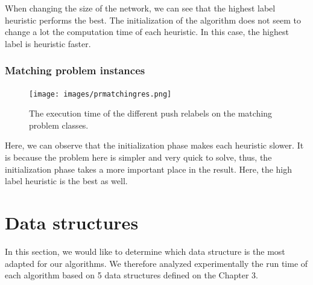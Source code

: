 When changing the size of the network, we can see that the highest label heuristic performs the best. The initialization of the algorithm does not seem to change a lot the computation time of each heuristic. In this case, the highest label is heuristic faster.


\subsubsection{Matching problem instances}
\begin{figure}[H]
\begin{center}
\texttt{[image: images/prmatchingres.png]}
\caption{The execution time of the different push relabels on the matching problem classes.}
\label{fig:mean_matching_pr}
\end{center}
\end{figure}

Here, we can observe that the initialization phase makes each heuristic slower. It is because the problem here is simpler and very quick to solve, thus, the initialization phase takes a more important place in the result. Here, the high label heuristic is the best as well.


\section{Data structures}

\label{sec:datastructuress}
In this section, we would like to determine which data structure is the most adapted for our algorithms. We therefore analyzed experimentally the run time of each algorithm based on 5 data structures defined on the Chapter 3.

